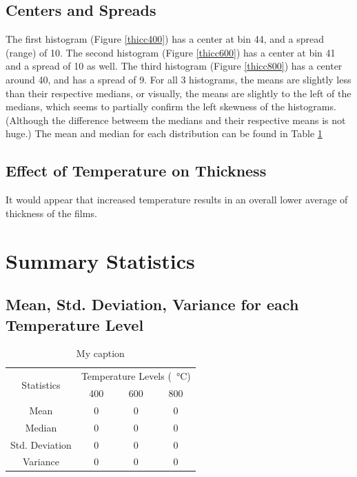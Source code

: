 \documentclass[letterpaper]{article}
\begin{document}
  \subsection{Centers and Spreads}
    The first histogram (Figure \ref{thicc400}) has a center at bin 44, and a spread (range) of 10.
    The second histogram (Figure \ref{thicc600}) has a center at bin 41 and a spread of 10 as well.
    The third histogram (Figure \ref{thicc800}) has a center around 40, and has a spread of 9.
    For all 3 histograms, the means are slightly less than their respective medians, or visually,
    the means are slightly to the left of the medians, which seems to partially confirm
    the left skewness of the histograms. (Although the difference betweem the medians and their
    respective means is not huge.) The mean and median for each distribution can be found in Table \ref{tempmean}


  \subsection{Effect of Temperature on Thickness}
    It would appear that increased temperature results in an overall lower average of thickness of the films.

\section{Summary Statistics}

  \subsection{Mean, Std. Deviation, Variance for each Temperature Level}

    \begin{table}[H]
    \centering
    \begin{tabular}{c|c|c|c|}
    \multirow{2}{*}{Statistics} & \multicolumn{3}{c|}{Temperature Levels (\SI{}{\celsius})} \\ \cline{2-4}
                                & 400           & 600          & 800          \\ \hline
    Mean                        & 0             & 0            & 0            \\ \hline
    Median                      & 0             & 0            & 0            \\ \hline
    Std. Deviation              & 0             & 0            & 0            \\ \hline
    Variance                    & 0             & 0            & 0            \\ \hline
    \end{tabular}
    \caption{My caption}
    \label{tempmean}
    \end{table}
\end{document}
